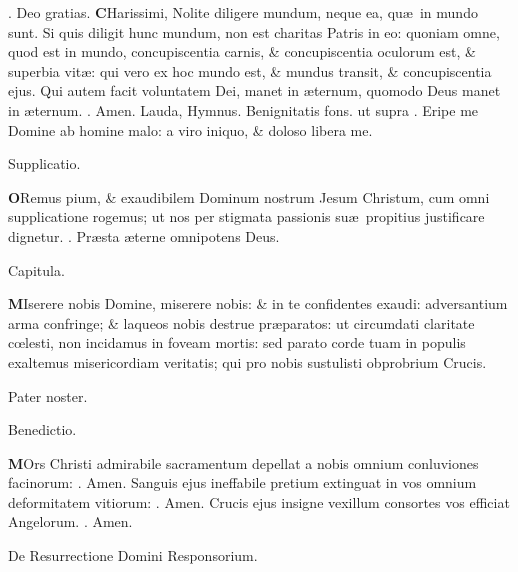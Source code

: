 \documentclass[letter,11pt]{book}
\makeatletter
\DeclareRobustCommand{\Vbar}{\vers@resp{-0.1em}{V}}
\DeclareRobustCommand{\Rbar}{\vers@resp{0pt}{R}}
\newcommand{\vers@resp@sym}{\raisebox{0.2ex}{\rotatebox[origin=c]{-20}{$\m@th\rceil$}}}
\newcommand{\vers@resp}[2]{%
  {\ooalign{\hidewidth\kern#1\vers@resp@sym\hidewidth\cr#2\cr}}%
}%
\def\V{\color{Red} \Vbar . \color{black}}
\def\R{\color{Red} \Rbar . \color{black}}
\makeatother
\begin{document}
\begin{multicols*}{2}
\par \noindent \R Deo gratias.
\lettrine[lines=2]{\bfseries \color{Red} C}{}Harissimi, Nolite diligere mundum, neque ea, qu\ae \ in mundo sunt. Si quis diligit hunc mundum, non est charitas Patris in eo: quoniam omne, quod est in mundo, concupiscentia carnis, \& concupiscentia oculorum est, \& superbia vit\ae : qui vero ex hoc mundo est, \& mundus transit, \& concupiscentia ejus. Qui autem facit voluntatem Dei, manet in \ae ternum, quomodo Deus manet in \ae ternum. \R Amen.
\newline \color{Red} Lauda, Hymnus. \color{black} Benignitatis fons. \color{Red} ut supra \color{black} \V Eripe me Domine ab homine malo: a viro iniquo, \& doloso libera me.
\vspace{-.5em} \begin{center} \color{Red} Supplicatio. \end{center} \vspace{-.5em}
\lettrine[lines=2]{\bfseries \color{Red} O}{}Remus pium, \& exaudibilem Dominum nostrum Jesum Christum, cum omni supplicatione rogemus; ut nos per stigmata passionis su\ae \ propitius justificare dignetur. \R Pr\ae sta \ae terne omnipotens Deus.
\vspace{-.5em} \begin{center} \color{Red} Capitula. \end{center} \vspace{-.5em}
\lettrine[lines=2]{\bfseries \color{Red} M}{}Iserere nobis Domine, miserere nobis: \& in te confidentes exaudi: adversantium arma confringe; \& laqueos nobis destrue pr\ae paratos: ut circumdati claritate c\oe lesti, non incidamus in foveam mortis: sed parato corde tuam in populis exaltemus misericordiam veritatis; qui pro nobis sustulisti obprobrium Crucis.
\par Pater noster.
\vspace{-.5em} \begin{center} \color{Red} Benedictio. \end{center} \vspace{-.5em}
\lettrine[lines=2]{\bfseries \color{Red} M}{}Ors Christi admirabile sacramentum depellat a nobis omnium conluviones facinorum: \R Amen. Sanguis ejus ineffabile pretium extinguat in vos omnium deformitatem vitiorum: \R Amen. Crucis ejus insigne vexillum consortes vos efficiat Angelorum. \R Amen.
\vspace{-.5em} \begin{center} \color{Red} De Resurrectione Domini Responsorium. \end{center} \vspace{-.5em}

\end{multicols*}
\end{document}
